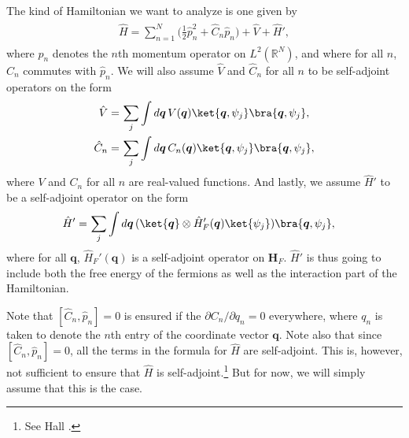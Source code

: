 \documentclass{report}
\begin{document}
The kind of Hamiltonian we want to analyze is one given by
\begin{align}
\begin{aligned}
	\hat H = \sum_{n=1}^{N} 
		\big( \frac{1}{2} \hat p_{n}^2 + \hat C_n \hat p_{n} \big) + 
		\hat V + \hat H',
\end{aligned}
\end{align} 
where $\hat p_n$ denotes the $n$th momentum operator on $L^2(\mathbb{R}^N)$, and where for all $n$, $\hat C_n$ commutes with $\hat p_n$. We will also assume $\hat V$ and $\hat C_n$ for all $n$ to be self-adjoint operators on the form
\begin{align}
\begin{aligned}
	\hat V =&\, \sum_{j} \int d\boldsymbol{q}\,  
		V(\boldsymbol{q}) \ket{\boldsymbol{q}, \psi_{j}} \bra{\boldsymbol{q}, \psi_{j}}, \\
	\hat C_{n} =&\, \sum_{j} \int d\boldsymbol{q}\,  
		C_n(\boldsymbol{q}) \ket{\boldsymbol{q}, \psi_{j}} \bra{\boldsymbol{q}, \psi_{j}},
\end{aligned}
\end{align} 
where $V$ and $C_n$ for all $n$ are real-valued functions. And lastly, we assume $\hat H'$ to be a self-adjoint operator on the form
\begin{align}
\begin{aligned}
	\hat H' =&\, \sum_{j} \int d\boldsymbol{q}\,  
		(\ket{\boldsymbol{q}} \otimes \hat H_F'(\boldsymbol{q}) \ket{\psi_{j}}) 
		\bra{\boldsymbol{q}, \psi_{j}}, 
\end{aligned}
\end{align} 
where for all $\boldsymbol{q}$, $\hat H_F'(\boldsymbol{q})$ is a self-adjoint operator on $\textbf{H}_F$. $\hat H'$ is thus going to include both the free energy of the fermions as well as the interaction part of the Hamiltonian. 

Note that $[\hat C_n, \hat p_n] = 0$ is ensured %
if the $\partial C_n / \partial q_n = 0$ everywhere, where $q_n$ is taken to denote the $n$th entry of the coordinate vector $\boldsymbol{q}$.
Note also that since $[\hat C_n, \hat p_n] = 0$, all the terms in the formula for $\hat H$ are self-adjoint. This is, however, not sufficient to ensure that $\hat H$ is self-adjoint.\footnote{See Hall \cite{}.} But for now, we will simply assume that this is the case. 
\end{document}
